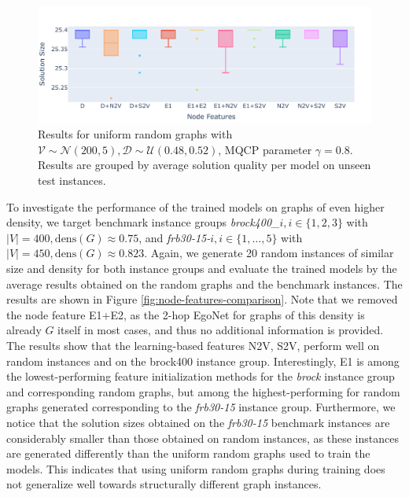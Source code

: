 \documentclass[draft,final]{vutinfth} %
\begin{document}
\begin{figure}
    \centering
    \includegraphics[width=\textwidth]{graphics/V200-048-052-random.pdf}
    \caption[]{Results for uniform random graphs with $ \mathcal{V} \sim \mathcal{N}(200, 5), \mathcal{D} \sim \mathcal{U}(0.48, 0.52)$, MQCP parameter $\gamma=0.8$. Results are grouped by average solution quality per model on unseen test instances. }
    \label{fig:V200-node-features}
\end{figure}

To investigate the performance of the trained models on graphs of even higher density, we target benchmark instance groups \emph{brock400\_}$i, i \in \{1,2,3\}$ with $|V| = 400, \mathrm{dens}(G) \approx 0.75$, and \emph{frb30-15-}$i, i \in \{1, \dots, 5\}$ with $|V| = 450, \mathrm{dens}(G) \approx 0.823$. 
Again, we generate 20 random instances of similar size and density for both instance groups and evaluate the trained models by the average results obtained on the random graphs and the benchmark instances. The results are shown in Figure \ref{fig:node-features-comparison}. 
Note that we removed the node feature E1+E2, as the 2-hop EgoNet for graphs of this density is already $G$ itself in most cases, and thus no additional information is provided. 
The results show that the learning-based features N2V, S2V, perform well on random instances and on the brock400 instance group. Interestingly, E1 is among the lowest-performing feature initialization methods for the \emph{brock} instance group and corresponding random graphs, but among the highest-performing for random graphs generated corresponding to the \emph{frb30-15} instance group. Furthermore, we notice that the solution sizes obtained on the \emph{frb30-15} benchmark instances are considerably smaller than those obtained on random instances, as these instances are generated differently than the uniform random graphs used to train the models. This indicates that using uniform random graphs during training does not generalize well towards structurally different graph instances. 
\end{document}

